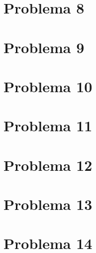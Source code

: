 \documentclass{homework}
\begin{document}
\color{black}
	



	\section{Problema 8}
\color{blue}

\color{black}
	



	\section{Problema 9}
\color{blue}

\color{black}
	



	\section{Problema 10}
\color{blue}

\color{black}
	



	\section{Problema 11}
\color{blue}

\color{black}
	



	\section{Problema 12}
\color{blue}

\color{black}
	



	\section{Problema 13}
\color{blue}

\color{black}
	



	\section{Problema 14}
\color{blue}

\color{black}
	
\end{document}
